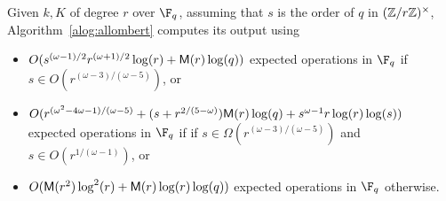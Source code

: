 \begin{proposition}
  \label{proposition:XiDelta-updated}
  Given $k,K$ of degree $r$ over $\F_q$, assuming that $s$ is the
  order of $q$ in $(\mathbb{Z}/r\mathbb{Z})^\times$,   Algorithm~\ref{alog:allombert} 
 computes its output using 
  \begin{itemize}
  \item $O(s^{(\omega-1)/2}r^{(\omega+1)/2}\log(r)+\mathsf{M}(r)\log(q))$
    expected operations in $\F_q$ if $s \in O(r^{(\omega-3)/(\omega-5)})$, or
  \item
    $O(
 r^{(\omega^2-4\omega-1)/(\omega-5)}+(s+r^{2/(5-\omega)})\mathsf{M}(r)\log(q)
+s^{\omega-1}r\log(r)\log(s))$
    expected operations in $\F_q$ if if $s \in \Omega(r^{(\omega-3)/(\omega-5)})$
    and $s \in O(r^{1/(\omega-1)})$, or
  \item $O(\mathsf{M}(r^2)\log^2(r) + \mathsf{M}(r)\log(r)\log(q))$ expected operations in
    $\F_q$ otherwise.
  \end{itemize}
\end{proposition}

